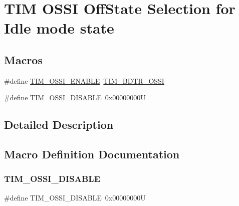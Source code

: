 \hypertarget{group___t_i_m___o_s_s_i___off___state___selection__for___idle__mode__state}{}\section{T\+IM O\+S\+SI Off\+State Selection for Idle mode state}
\label{group___t_i_m___o_s_s_i___off___state___selection__for___idle__mode__state}
\subsection*{Macros}
\begin{DoxyCompactItemize}
\item 
\#define \mbox{\hyperlink{group___t_i_m___o_s_s_i___off___state___selection__for___idle__mode__state_gae5b5901b177cd054cd5503630892680f}{T\+I\+M\+\_\+\+O\+S\+S\+I\+\_\+\+E\+N\+A\+B\+LE}}~\mbox{\hyperlink{group___peripheral___registers___bits___definition_gab1cf04e70ccf3d4aba5afcf2496a411a}{T\+I\+M\+\_\+\+B\+D\+T\+R\+\_\+\+O\+S\+SI}}
\item 
\#define \mbox{\hyperlink{group___t_i_m___o_s_s_i___off___state___selection__for___idle__mode__state_gab1a20c65a3d24ef770f8a2a14c24130b}{T\+I\+M\+\_\+\+O\+S\+S\+I\+\_\+\+D\+I\+S\+A\+B\+LE}}~0x00000000U
\end{DoxyCompactItemize}


\subsection{Detailed Description}


\subsection{Macro Definition Documentation}
\mbox{\label{group___t_i_m___o_s_s_i___off___state___selection__for___idle__mode__state_gab1a20c65a3d24ef770f8a2a14c24130b}} 
\subsubsection{\texorpdfstring{TIM\_OSSI\_DISABLE}{TIM\_OSSI\_DISABLE}}
{\footnotesize\ttfamily \#define T\+I\+M\+\_\+\+O\+S\+S\+I\+\_\+\+D\+I\+S\+A\+B\+LE~0x00000000U}

